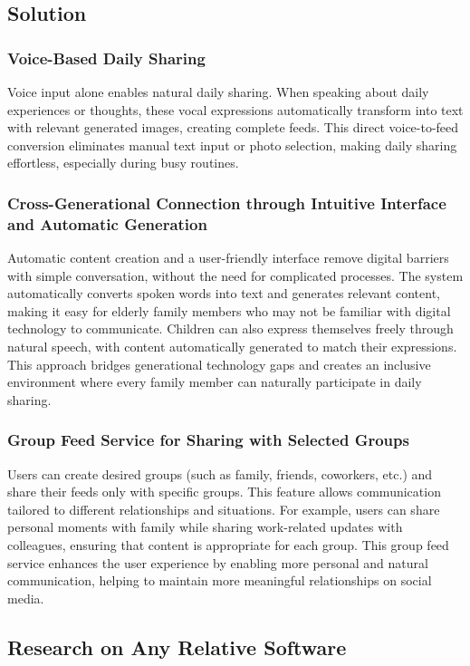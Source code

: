 \documentclass[conference]{IEEEtran}
\begin{document}
    \subsection{Solution}
        \subsubsection{Voice-Based Daily Sharing}
        Voice input alone enables natural daily sharing. When speaking about daily experiences or thoughts, these vocal expressions automatically transform into text with relevant generated images, creating complete feeds. This direct voice-to-feed conversion eliminates manual text input or photo selection, making daily sharing effortless, especially during busy routines.

        \subsubsection{Cross-Generational Connection through Intuitive Interface and Automatic Generation}
        Automatic content creation and a user-friendly interface remove digital barriers with simple conversation, without the need for complicated processes. The system automatically converts spoken words into text and generates relevant content, making it easy for elderly family members who may not be familiar with digital technology to communicate. Children can also express themselves freely through natural speech, with content automatically generated to match their expressions. This approach bridges generational technology gaps and creates an inclusive environment where every family member can naturally participate in daily sharing.

        \subsubsection{Group Feed Service for Sharing with Selected Groups}
        Users can create desired groups (such as family, friends, coworkers, etc.) and share their feeds only with specific groups. This feature allows communication tailored to different relationships and situations. For example, users can share personal moments with family while sharing work-related updates with colleagues, ensuring that content is appropriate for each group. This group feed service enhances the user experience by enabling more personal and natural communication, helping to maintain more meaningful relationships on social media.

    \subsection{Research on Any Relative Software}
\end{document}
